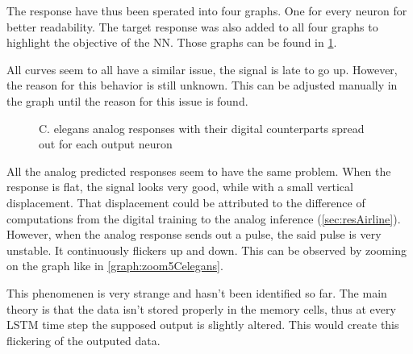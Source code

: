 The response have thus been sperated into four graphs. One for every neuron for better readability. The target response was also added to all four graphs to highlight the objective of the \ac{NN}. Those graphs can be found in \cref{graph:spread5Celegans}.

All curves seem to all have a similar issue, the signal is late to go up. However, the reason for this behavior is still unknown. This can be adjusted manually in the graph until the reason for this issue is found.

\begin{figure}[H]
  \centering
  \begin{minipage}{\columnwidth}
    \hfill
  \end{minipage}
  \begin{minipage}{\columnwidth}
    \hfill
  \end{minipage}
  \caption{\ac{C. elegans} analog responses with their digital counterparts spread out for each output neuron}
  \label{graph:spread5Celegans}
\end{figure}

All the analog predicted responses seem to have the same problem. When the response is flat, the signal looks very good, while with a small vertical displacement. That displacement could be attributed to the difference of computations from the digital training to the analog inference (\cref{sec:resAirline}). However, when the analog response sends out a pulse, the said pulse is very unstable. It continuously flickers up and down. This can be observed by zooming on the graph like in \cref{graph:zoom5Celegans}.

This phenomenen is very strange and hasn't been identified so far. The main theory is that the data isn't stored properly in the memory cells, thus at every \ac{LSTM} time step the supposed output is slightly altered. This would create this flickering of the outputed data.


